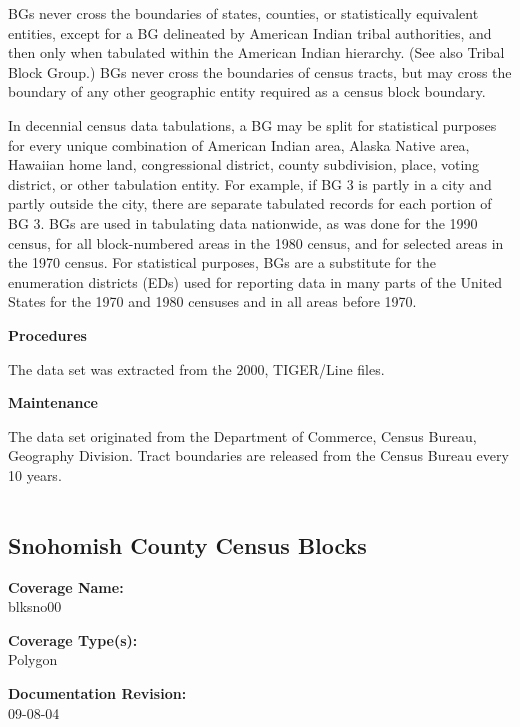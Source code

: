 BGs never cross the boundaries of states, counties, or
statistically equivalent entities, except for a BG delineated by
American Indian tribal authorities, and then only when tabulated
within the American Indian hierarchy. (See also Tribal Block
Group.) BGs never cross the boundaries of census tracts, but may
cross the boundary of any other geographic entity required as a
census block boundary.

In decennial census data tabulations, a BG may be split for
statistical purposes for every unique combination of American
Indian area, Alaska Native area, Hawaiian home land, congressional
district, county subdivision, place, voting district, or other
tabulation entity. For example, if BG 3 is partly in a city and
partly outside the city, there are separate tabulated records for
each portion of BG 3. BGs are used in tabulating data nationwide,
as was done for the 1990 census, for all block-numbered areas in
the 1980 census, and for selected areas in the 1970 census. For
statistical purposes, BGs are a substitute for the enumeration
districts (EDs) used for reporting data in many parts of the
United States for the 1970 and 1980 censuses and in all areas
before 1970.

{\bf \large Procedures}

The data set was extracted from the 2000, TIGER/Line files.

{\bf \large Maintenance}

The data set originated from the Department of Commerce, Census
Bureau, Geography Division. Tract boundaries are released from the
Census Bureau every 10 years.

\begin{landscape}
\begin{longtable}{llrrrrrc}

\end{longtable}
\end{landscape}
\newpage

\subsection{Snohomish County Census Blocks}

{\bf \large Coverage Name:}\\
blksno00

{\bf \large Coverage Type(s):}\\
Polygon

{\bf \large Documentation Revision:}\\
09-08-04

